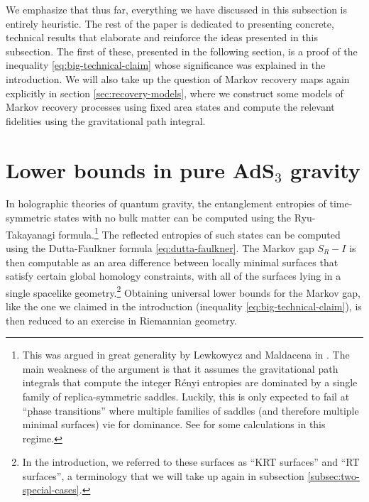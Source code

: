 \documentclass[a4paper,11pt]{article}
\begin{document}
We emphasize that thus far, everything we have discussed in this subsection is entirely heuristic. The rest of the paper is dedicated to presenting concrete, technical results that elaborate and reinforce the ideas presented in this subsection. The first of these, presented in the following section, is a proof of the inequality \eqref{eq:big-technical-claim} whose significance was explained in the introduction. We will also take up the question of Markov recovery maps again explicitly in section \ref{sec:recovery-models}, where we construct some models of Markov recovery processes using fixed area states and compute the relevant fidelities using the gravitational path integral.

\section{Lower bounds in pure AdS$_3$ gravity}
\label{sec:geometric-proof}

In holographic theories of quantum gravity, the entanglement entropies of time-symmetric states with no bulk matter can be computed using the Ryu-Takayanagi formula.\footnote{This was argued in great generality by Lewkowycz and Maldacena in \cite{LM}. The main weakness of the argument is that it assumes the gravitational path integrals that compute the integer R\'{e}nyi entropies are dominated by a single family of replica-symmetric saddles. Luckily, this is only expected to fail at ``phase transitions'' where multiple families of saddles (and therefore multiple minimal surfaces) vie for dominance. See \cite{competing-saddles-1, competing-saddles-2} for some calculations in this regime.} The reflected entropies of such states can be computed using the Dutta-Faulkner formula \eqref{eq:dutta-faulkner}. The Markov gap $S_R - I$ is then computable as an area difference between locally minimal surfaces that satisfy certain  global homology constraints, with all of the surfaces lying in a single spacelike geometry.\footnote{In the introduction, we referred to these surfaces as ``KRT surfaces'' and ``RT surfaces'', a terminology that we will take up again in subsection \ref{subsec:two-special-cases}.} Obtaining universal lower bounds for the Markov gap, like the one we claimed in the introduction (inequality \eqref{eq:big-technical-claim}), is then reduced to an exercise in Riemannian geometry.
\end{document}
